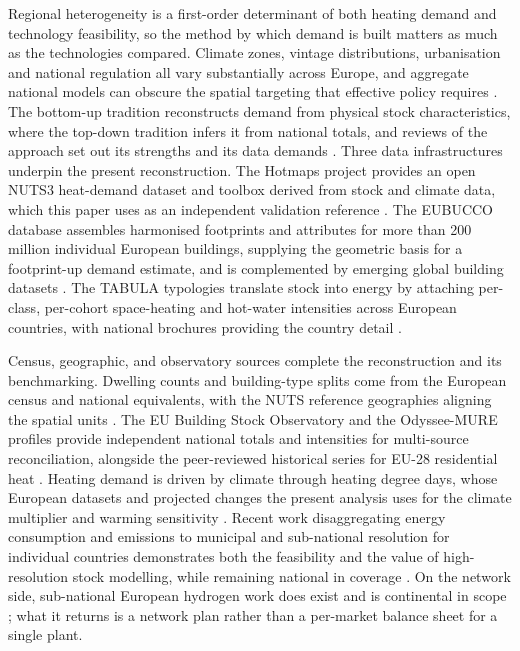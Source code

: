 Regional heterogeneity is a first-order determinant of both heating demand and
technology feasibility, so the method by which demand is built matters as much as
the technologies compared. Climate zones, vintage distributions, urbanisation and
national regulation all vary substantially across Europe, and aggregate national
models can obscure the spatial targeting that effective policy requires
\citep{Hotmaps2020,Mller2019Heat}. The
bottom-up tradition reconstructs demand from physical stock characteristics, where the top-down tradition infers it from national totals, and reviews of the approach set out its
strengths and its data demands \citep{SueWing2008Synthesis,Prina2020Classification}. Three data infrastructures underpin the present reconstruction.
The Hotmaps project provides an open NUTS3 heat-demand dataset and toolbox derived
from stock and climate data, which this paper uses as an independent validation
reference \citep{Hotmaps2020,Hotmaps2019}.
The EUBUCCO database assembles harmonised footprints and attributes for more than
200 million individual European buildings, supplying the geometric basis for a
footprint-up demand estimate, and is complemented by emerging global building
datasets \citep{MilojevicDupont2023Eubucco, Zhu2025GlobalBuildingAtlas}. The
TABULA typologies translate stock into energy by attaching per-class, per-cohort
space-heating and hot-water intensities across European countries, with national
brochures providing the country detail \citep{Loga2016Tabula,Cyx2011TabulaBelgium}.

Census, geographic, and observatory sources complete the reconstruction and its
benchmarking. Dwelling counts and building-type splits come from the European census and
national equivalents, with the NUTS reference geographies aligning the spatial units
\citep{Eurostat2021census,ONS2021TS044}. The EU Building Stock Observatory and the
Odyssee-MURE profiles provide independent national totals and intensities for
multi-source reconciliation, alongside the peer-reviewed historical series for EU-28
residential heat \citep{BSO2025}. Heating demand is driven by climate through
heating degree days, whose European datasets and projected changes the present analysis
uses for the climate multiplier and warming sensitivity
\citep{EurostatHDD2025}. Recent work disaggregating energy consumption and
emissions to municipal and sub-national resolution for individual countries demonstrates
both the feasibility and the value of high-resolution stock modelling, while remaining national in coverage \citep{Patil2025Disaggregated}. On the network side, sub-national European hydrogen work does exist and is continental in scope \citep{Neumann2023H2Network,Kountouris2024Unified}; what it returns is a network plan rather than a per-market balance sheet for a single plant.

